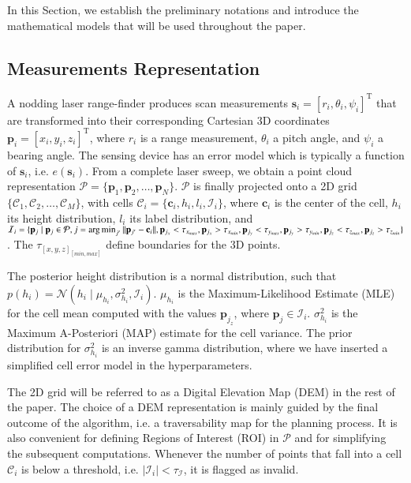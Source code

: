In this Section, we establish the preliminary notations and introduce the
mathematical models that will be used throughout the paper.

\subsection{Measurements Representation}
A nodding laser range-finder produces scan measurements $\mathbf{s}_i=[r_i,
\theta_i,\psi_i]^\text{T}$ that are transformed into their corresponding
Cartesian 3D coordinates $\mathbf{p}_i=[x_i,y_i,z_i]^\text{T}$, where $r_i$ is
a range measurement, $\theta_i$ a pitch angle, and $\psi_i$ a bearing angle. The
sensing device has an error model which is typically a function of
$\mathbf{s}_i$, i.e. $e(\mathbf{s}_i)$. From a complete laser sweep, we obtain a
point cloud representation $\mathcal{P}=\{\mathbf{p}_1,\mathbf{p}_2,\dots,
\mathbf{p}_N\}$. $\mathcal{P}$ is finally projected onto a 2D grid
$\{\mathcal{C}_1,\mathcal{C}_2,\dots,\mathcal{C}_M\}$, with cells
$\mathcal{C}_i=\{\mathbf{c}_i,h_i,l_i,\mathcal{I}_i\}$, where $\mathbf{c}_i$ is
the center of the cell, $h_i$ its height distribution, $l_i$ its label
distribution, and $\mathcal{I}_i=\{\mathbf{p}_j\mid\mathbf{p}_j\in\mathcal{P},
j=\operatorname*{arg\,min}_{j'}||\mathbf{p}_{j'}-\mathbf{c}_i||,\mathbf{p}_{j_x}<\tau_{x_{max}},
\mathbf{p}_{j_x}>\tau_{x_{min}},\mathbf{p}_{j_y}<\tau_{y_{max}},\mathbf{p}_{j_y}
>\tau_{y_{min}},\mathbf{p}_{j_z}<\tau_{z_{max}},\mathbf{p}_{j_z}>
\tau_{z_{min}}\}$. The $\tau_{[x,y,z]_{[min,max]}}$ define boundaries for the 3D
points.

The posterior height distribution is a normal distribution, such that $p(h_i)=
\mathcal{N}(h_i\mid\mu_{h_i},\sigma^2_{h_i},\mathcal{I}_i)$. $\mu_{h_i}$ is the
Maximum-Likelihood Estimate (MLE) for the cell mean computed with the values
$\mathbf{p}_{j_z}$, where $\mathbf{p}_j\in\mathcal{I}_i$. $\sigma^2_{h_i}$ is
the Maximum A-Posteriori (MAP) estimate for the cell variance. The prior
distribution for $\sigma^2_{h_i}$ is an inverse gamma distribution, where we
have inserted a simplified cell error model in the hyperparameters.

The 2D grid will be referred to as a Digital Elevation Map (DEM) in the rest of
the paper. The choice of a DEM representation is mainly guided by the final
outcome of the algorithm, i.e. a traversability map for the planning process. It
is also convenient for defining Regions of Interest (ROI) in $\mathcal{P}$ and
for simplifying the subsequent computations. Whenever the number of points that
fall into a cell $\mathcal{C}_i$ is below a threshold, i.e. $|\mathcal{I}_i|<
\tau_{\mathcal{I}}$, it is flagged as invalid.

